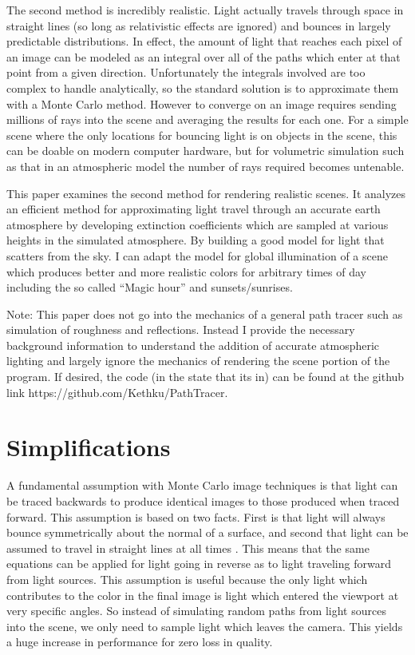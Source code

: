 \documentclass[12pt, letterpaper]{article}
\begin{document}
The second method is incredibly realistic. Light actually travels through space
in straight lines (so long as relativistic effects are ignored) and bounces in
largely predictable distributions. In effect, the amount of light that reaches
each pixel of an image can be modeled as an integral over all of the paths which
enter at that point from a given direction. Unfortunately the integrals involved
are too complex to handle analytically, so the standard solution is to
approximate them with a Monte Carlo method. However to converge on an image
requires sending millions of rays into the scene and averaging the results for
each one. For a simple scene where the only locations for bouncing light is on
objects in the scene, this can be doable on modern computer hardware, but for
volumetric simulation such as that in an atmospheric model the number of rays
required becomes untenable.

This paper examines the second method for rendering realistic scenes. It
analyzes an efficient method for approximating light travel through an accurate
earth atmosphere by developing extinction coefficients which are sampled at
various heights in the simulated atmosphere. By building a good model for light
that scatters from the sky. I can adapt the model for global illumination of a
scene which produces better and more realistic colors for arbitrary times of day
including the so called ``Magic hour'' and sunsets/sunrises.

Note: This paper does not go into the mechanics of a general path tracer such as
simulation of roughness and reflections. Instead I provide the necessary
background information to understand the addition of accurate atmospheric
lighting and largely ignore the mechanics of rendering the scene portion of the
program. If desired, the code (in the state that its in) can be found at the
github link https://github.com/Kethku/PathTracer.

\section{Simplifications}

A fundamental assumption with Monte Carlo image techniques is that light can be
traced backwards to produce identical images to those produced when traced
forward. This assumption is based on two facts. First is that light will always
bounce symmetrically about the normal of a surface, and second that light can be
assumed to travel in straight lines at all times \cite{veach}. This means that
the same equations can be applied for light going in reverse as to light
traveling forward from light sources. This assumption is useful because the only
light which contributes to the color in the final image is light which entered
the viewport at very specific angles. So instead of simulating random paths from
light sources into the scene, we only need to sample light which leaves the
camera. This yields a huge increase in performance for zero loss in quality.
\end{document}

